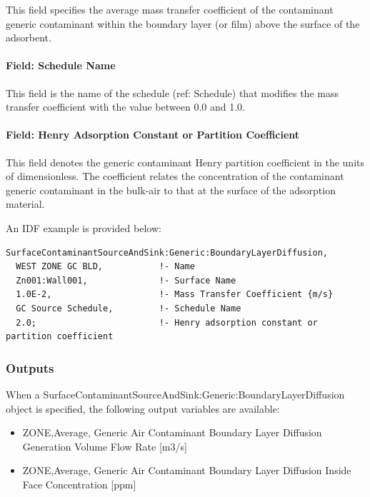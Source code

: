 This field specifies the average mass transfer coefficient of the contaminant generic contaminant within the boundary layer (or film) above the surface of the adsorbent.

\paragraph{Field: Schedule Name}\label{field-schedule-name-8}

This field is the name of the schedule (ref: Schedule) that modifies the mass transfer coefficient with the value between 0.0 and 1.0.

\paragraph{Field: Henry Adsorption Constant or Partition Coefficient}\label{field-henry-adsorption-constant-or-partition-coefficient}

This field denotes the generic contaminant Henry partition coefficient in the units of dimensionless. The coefficient relates the concentration of the contaminant generic contaminant in the bulk-air to that at the surface of the adsorption material.

An IDF example is provided below:

\begin{lstlisting}
SurfaceContaminantSourceAndSink:Generic:BoundaryLayerDiffusion,
  WEST ZONE GC BLD,           !- Name
  Zn001:Wall001,              !- Surface Name
  1.0E-2,                     !- Mass Transfer Coefficient {m/s}
  GC Source Schedule,         !- Schedule Name
  2.0;                        !- Henry adsorption constant or partition coefficient
\end{lstlisting}

\subsubsection{Outputs}\label{outputs-11-003}

When a Sur\-face\-Con\-taminant\-Source\-And\-Sink:\-Generic:\-Boundary\-Layer\-Diffusion object is specified, the following output variables are available:

\begin{itemize}
  \tightlist
  \item
    ZONE,Average, Generic Air Contaminant Boundary Layer Diffusion Generation Volume Flow Rate {[}m3/s{]}
  \item
    ZONE,Average, Generic Air Contaminant Boundary Layer Diffusion Inside Face Concentration {[}ppm{]}
\end{itemize}

